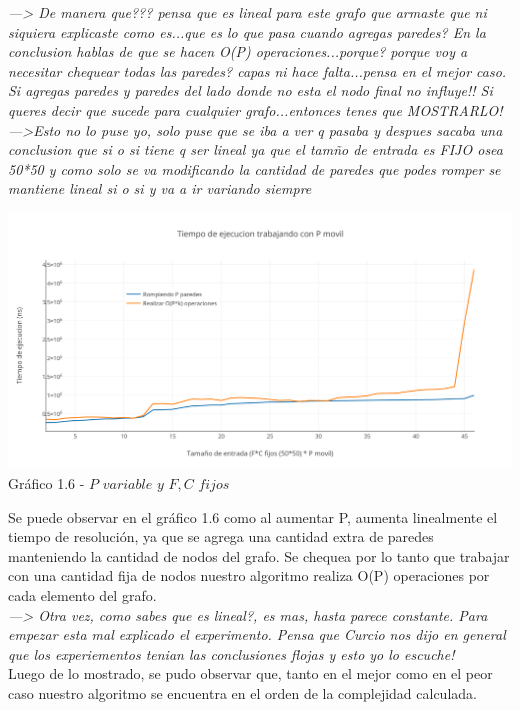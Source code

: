 \textit{---> De manera que??? pensa que es lineal para este grafo que armaste que ni siquiera explicaste como es...que es lo que pasa cuando agregas paredes? En la conclusion hablas de que se hacen O(P) operaciones...porque? porque voy a necesitar chequear todas las paredes? capas ni hace falta...pensa en el mejor caso. Si agregas paredes y paredes del lado donde no esta el nodo final no influye!! Si queres decir que sucede para cualquier grafo...entonces tenes que MOSTRARLO!}\\

\textit{--->Esto no lo puse yo, solo puse que se iba a ver q pasaba y despues sacaba una conclusion que si o si tiene q ser lineal ya que el tamño de entrada es FIJO osea 50*50 y como solo se va modificando la cantidad de paredes que podes romper se mantiene lineal si o si y va a ir variando siempre}


\vspace*{0.3cm} \vspace*{0.3cm}
  \begin{center}
\includegraphics[scale=0.7]{./EJ1/pVariable.png}
{Gr\'afico 1.6 - $P$ $variable$ $y$ $F,C$ $fijos$}
  \end{center}
  \vspace*{0.3cm}

Se puede observar en el gr\'afico 1.6 como al aumentar P, aumenta linealmente el tiempo de resoluci\'on, ya que se agrega una cantidad extra de paredes manteniendo la cantidad de nodos del grafo. Se chequea por lo tanto que trabajar con una cantidad fija de nodos nuestro algoritmo realiza O(P) operaciones por cada elemento del grafo.\\

\textit{---> Otra vez, como sabes que es lineal?, es mas, hasta parece constante. Para empezar esta mal explicado el experimento. Pensa que Curcio nos dijo en general que los experiementos tenian las conclusiones flojas y esto yo lo escuche!}\\

Luego de lo mostrado, se pudo observar que, tanto en el mejor como en el peor caso nuestro algoritmo se encuentra en el orden de la complejidad calculada.
